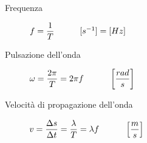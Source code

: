 \documentclass[a4paper,11pt,italian]{article}
\begin{document}
\begin{description}
%   
%   
%   
%   
%   
%   
  
  \item[Frequenza] 
$ f = \dfrac{1}{T} \hspace*{3em} [s^{-1}]=[ Hz] $
  
  \item[Pulsazione dell'onda] $ \omega = \dfrac{2\pi}{T} = 2\pi f \hspace*{3em} \left[ \dfrac{rad}{s} \right] $
  
  
  \item[Velocità di propagazione dell'onda] $ v = \dfrac{\Delta s}{\Delta t} = \dfrac{\lambda}{T} = \lambda f \hspace*{3em} \left[ \dfrac{m}{s} \right] $
  
  

\end{description}
\end{document}
